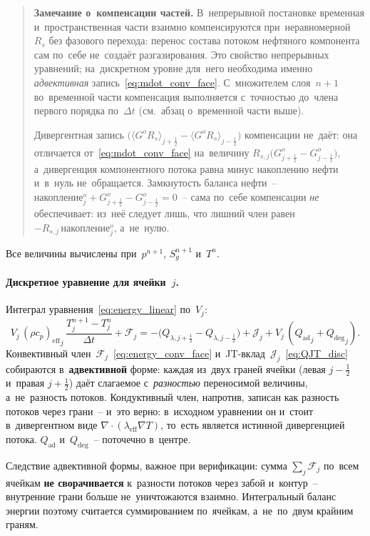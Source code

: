\documentclass[12pt,a4paper]{article}
\newcommand{\half}{\tfrac{1}{2}}
\newcommand{\rhocpeff}{(\rho c_p)_{\mathrm{eff}}}
\newcommand{\leff}{\lambda_{\mathrm{eff}}}
\newcommand{\Qad}{Q_{\mathrm{ad}}}
\newcommand{\Qdeg}{Q_{\mathrm{deg}}}
\begin{document}
\begin{quote}\small
\textbf{Замечание о~компенсации частей.}
В~непрерывной постановке временная и~пространственная части
взаимно компенсируются при~неравномерной~$R_s$ без фазового
перехода: перенос состава потоком нефтяного компонента сам по~себе
не~создаёт разгазирования. Это свойство непрерывных уравнений;
на~дискретном уровне для~него необходима именно
\emph{адвективная} запись~\eqref{eq:mdot_conv_face}. С~множителем
слоя~$n+1$ во~временной части компенсация выполняется с~точностью
до~члена первого порядка по~$\Delta t$
(см.~абзац о~временной части выше).

Дивергентная запись $\bigl(\langle G^oR_s\rangle_{j+\half}
- \langle G^oR_s\rangle_{j-\half}\bigr)$ компенсации не~даёт:
она отличается от~\eqref{eq:mdot_conv_face} на~величину
$R_{s,j}\bigl(G^o_{j+\half} - G^o_{j-\half}\bigr)$, а~дивергенция
компонентного потока равна минус накоплению нефти
и~в~нуль не~обращается. Замкнутость баланса нефти~--
$\text{накопление}^o_j + G^o_{j+\half} - G^o_{j-\half} = 0$~--
сама по~себе компенсации \emph{не} обеспечивает: из~неё следует лишь,
что лишний член равен $-R_{s,j}\,\text{накопление}^o_j$, а~не~нулю.
\end{quote}

Все величины вычислены при~$p^{n+1}$, $S_g^{n+1}$ и~$T^n$.

\paragraph{Дискретное уравнение для ячейки~$j$.}
Интеграл уравнения~\eqref{eq:energy_linear} по~$V_j$:
\begin{equation}\label{eq:energy_disc_full}
  \boxed{
    V_j\,{\rhocpeff}_j\,\frac{T_j^{n+1} - T_j^n}{\Delta t}
    + \mathcal{F}_j
    = -\bigl(Q_{\lambda,j+\half} - Q_{\lambda,j-\half}\bigr)
    + \mathcal{J}_j
    + V_j\,({\Qad}_j + {\Qdeg}_j).
  }
\end{equation}
Конвективный член~$\mathcal{F}_j$~\eqref{eq:energy_conv_face}
и~JT-вклад~$\mathcal{J}_j$~\eqref{eq:QJT_disc} собираются
в~\textbf{адвективной} форме: каждая из~двух граней ячейки
(левая $j{-}\half$ и~правая $j{+}\half$) даёт слагаемое
с~\emph{разностью} переносимой величины, а~не~разность потоков.
Кондуктивный член, напротив, записан как разность потоков
через грани~-- и~это верно: в~исходном уравнении он и~стоит
в~дивергентном виде $\nabla\!\cdot\!(\leff\nabla T)$, то~есть
является истинной дивергенцией потока.
$\Qad$ и~$\Qdeg$~-- поточечно в~центре.

Следствие адвективной формы, важное при верификации: сумма
$\sum_j \mathcal{F}_j$ по~всем ячейкам \textbf{не сворачивается}
к~разности потоков через забой и~контур~-- внутренние грани
больше не~уничтожаются взаимно. Интегральный баланс энергии
поэтому считается суммированием по~ячейкам, а~не~по~двум крайним
граням.
\end{document}
